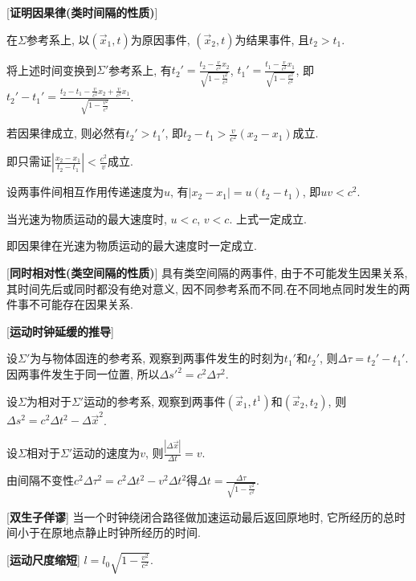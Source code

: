 [\textbf{证明因果律(类时间隔的性质)}]\par
\qquad 在$\Sigma$参考系上, 以$(\vec x_1,t)$为原因事件, $(\vec x_2,t)$为结果事件, 且$t_2>t_1$.\par
\qquad 将上述时间变换到$\Sigma'$参考系上, 有$t_2'=\frac{t_2-\frac{v}{c^2}x_2}{\sqrt{1-\frac{v^2}{c^2}}}$, $t_1'=\frac{t_1-\frac{v}{c^2}x_1}{\sqrt{1-\frac{v^2}{c^2}}}$, 即$t_2'-t_1'=\frac{t_2-t_1-\frac{v}{c^2}x_2+\frac{v}{c^2}x_1}{\sqrt{1-\frac{v^2}{c^2}}}$.\par
\qquad 若因果律成立, 则必然有$t_2'>t_1'$, 即$t_2-t_1>\frac{v}{c^2}(x_2-x_1)$成立.\par
\qquad 即只需证$\left|\frac{x_2-x_1}{t_2-t_1}\right|<\frac{c^2}{v}$成立.\par
\qquad 设两事件间相互作用传递速度为$u$, 有$|x_2-x_1|=u(t_2-t_1)$, 即$uv<c^2$.\par
\qquad 当光速为物质运动的最大速度时, $u<c$, $v<c$. 上式一定成立.\par
\qquad 即因果律在光速为物质运动的最大速度时一定成立.\par

[\textbf{同时相对性(类空间隔的性质)}] 具有类空间隔的两事件, 由于不可能发生因果关系, 其时间先后或同时都没有绝对意义, 因不同参考系而不同.在不同地点同时发生的两件事不可能存在因果关系.\par

[\textbf{运动时钟延缓的推导}]\par
\qquad 设$\Sigma'$为与物体固连的参考系, 观察到两事件发生的时刻为$t_1'$和$t_2'$, 则$\Delta\tau=t_2'-t_1'$. 因两事件发生于同一位置, 所以$\Delta s'^2=c^2\Delta\tau^2$.\par
\qquad 设$\Sigma$为相对于$\Sigma'$运动的参考系, 观察到两事件$(\vec x_1,t^1)$和$(\vec x_2,t_2)$, 则$\Delta s^2=c^2\Delta t^2-\Delta \vec x^2$.\par
\qquad 设$\Sigma$相对于$\Sigma'$运动的速度为$v$, 则$\frac{|\Delta \vec x|}{\Delta t}=v$.\par
\qquad 由间隔不变性$c^2\Delta\tau^2=c^2\Delta t^2-v^2\Delta t^2$得$\Delta t=\frac{\Delta\tau}{\sqrt{1-\frac{v^2}{c^2}}}$.\par

[\textbf{双生子佯谬}] 当一个时钟绕闭合路径做加速运动最后返回原地时, 它所经历的总时间小于在原地点静止时钟所经历的时间.\par

\clearpage

[\textbf{运动尺度缩短}] $l=l_0\sqrt{1-\frac{v^2}{c^2}}$.\par


